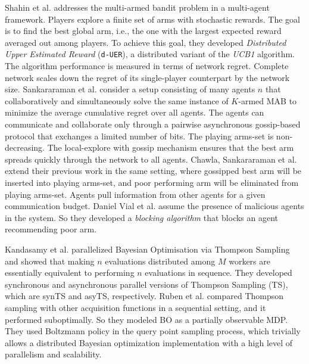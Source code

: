 Shahin et al. \cite{Shahrampour} addresses the multi-armed bandit problem in a multi-agent framework. 
Players explore a finite set of arms with stochastic rewards. 
The goal is to find the best global arm, i.e., the one with the largest expected reward averaged out among players. 
To achieve this goal, they developed \textit{Distributed Upper Estimated Reward} (\texttt{d-UER}), a distributed variant of the \textit{UCB1} algorithm. 
The algorithm performance is measured in terms of network regret. Complete network scales down the regret of its single-player counterpart by the network size.
Sankararaman et al. \cite{Sankararaman.ma.mab} consider a setup consisting of many agents $n$ that collaboratively and simultaneously solve the same instance of $K$-armed MAB to minimize the average cumulative regret over all agents. 
The agents can communicate and collaborate only through a pairwise asynchronous gossip-based protocol that exchanges a limited number of bits. The playing arms-set is non-decreasing. 
The local-explore with gossip mechanism ensures that the best arm spreads quickly through the network to all agents.
Chawla, Sankararaman et al. \cite{chawla2020gossiping} extend their previous work in the same setting, where gossipped best arm will be inserted into playing arms-set, and poor performing arm will be eliminated from playing arms-set. 
Agents pull information from other agents for a given communication budget.
Daniel Vial et al. \cite{Daniel.robust.ma.mab} assume the presence of malicious agents in the system. So they developed a \textit{blocking algorithm} that blocks an agent recommending poor arm.

Kandasamy et al. \cite{pmlr-v84-kandasamy18a} parallelized Bayesian Optimisation via Thompson Sampling and showed that making $n$ evaluations distributed among $M$ workers are essentially equivalent to performing $n$ evaluations in sequence. 
They developed synchronous and asynchronous parallel versions of Thompson Sampling (TS), which are synTS and asyTS, respectively.
Ruben et al. \cite{Ruben.distr.bo} compared Thompson sampling with other acquisition functions in a sequential setting, and it performed suboptimally. So they modeled BO as a partially observable MDP. They used Boltzmann policy in the query point sampling process, which trivially allows a distributed Bayesian optimization implementation with a high level of parallelism and scalability.


